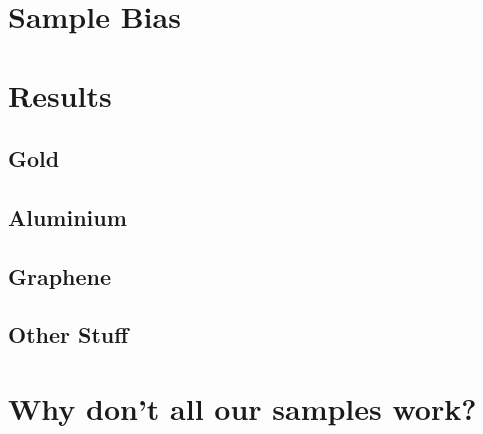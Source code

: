 \section{Sample Bias}\label{section:sample_bias}

\section{Results}

\subsection{Gold}

\subsection{Aluminium}

\subsection{Graphene}

\subsection{Other Stuff}

\section{Why don't all our samples work?}